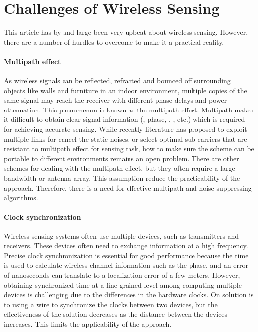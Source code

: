 \section{Challenges of Wireless Sensing}
This article has by and large been very upbeat about wireless sensing. However, there are a number of hurdles to overcome to make it a
practical reality.

\paragraph*{Multipath effect}  As wireless signals can be reflected, refracted and bounced off
surrounding objects like walls and furniture in an indoor environment, multiple copies of the same signal may reach the receiver with
different phase delays and power attenuation. This phenomenon is known as the multipath effect. Multipath makes it difficult to obtain
clear signal information (\RSSI, phase, \AoA, \TOF, etc.) which is required for achieving accurate sensing. While recently literature has
proposed to exploit multiple links for cancel the static noises, or select optimal sub-carriers that are resistant to multipath effect for
sensing task, how to make sure the scheme can be portable to different environments remains an open problem. There are other schemes for
dealing with the multipath effect, but they often require a large bandwidth or antenna array. This assumption reduce the practicability of
the approach. Therefore, there is a need for effective multipath and noise suppressing algorithms.

\paragraph*{Clock synchronization} Wireless sensing systems often use multiple devices, such as transmitters and receivers. These devices often
need to exchange information at a high frequency. Precise clock synchronization is essential for good performance because the time is used
to calculate wireless channel information such as the phase, and an error of nanoseconds can translate to a localization error of a few
meters. However, obtaining synchronized time at a fine-grained level among computing multiple devices is challenging due to the differences
in the hardware clocks. On solution is to using a wire to synchronize the clocks between two devices, but the effectiveness of the solution
decreases as the distance between the devices increases. This limits the applicability of the approach.

